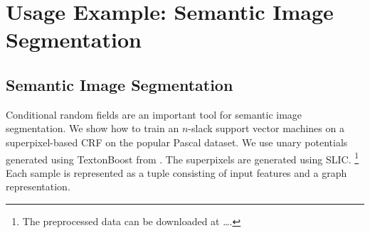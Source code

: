 \section{Usage Example: Semantic Image Segmentation}\label{sec:examples}
%


\subsection{Semantic Image Segmentation}
Conditional random fields are an important tool for semantic image segmentation.
We show how to train an $n$-slack support vector machines on a superpixel-based CRF
on the popular Pascal dataset. We use unary potentials generated using TextonBoost
from \cite{krahenbuhl2012efficient}. The superpixels are generated using SLIC.%
\footnote{The preprocessed data can be downloaded at \dots.}
Each sample is represented as a tuple consisting of input features and a graph representation.

